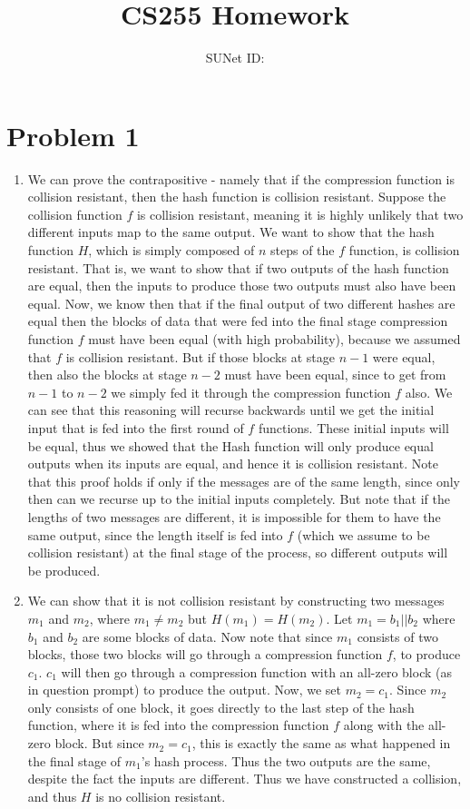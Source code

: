 \documentclass{article}
\title{CS255 Homework \esnumber}
\author{\studentname \qquad SUNet ID: \suid}
\begin{document}
\maketitle

\section*{Problem 1}
\begin{enumerate}
\item %
We can prove the contrapositive - namely that if the compression function is collision resistant, then the hash function is collision resistant. Suppose the collision function $f$ is collision resistant, meaning it is highly unlikely that two different inputs map to the same output. We want to show that the hash function $H$, which is simply composed of $n$ steps of the $f$ function, is collision resistant. That is, we want to show that if two outputs of the hash function are equal, then the inputs to produce those two outputs must also have been equal.
Now, we know then that if the final output of two different hashes are equal then the blocks of data that were fed into the final stage compression function $f$ must have been equal (with high probability), because we assumed that $f$ is collision resistant. But if those blocks at stage $n-1$ were equal, then also the blocks at stage $n-2$ must have been equal, since to get from $n-1$ to $n-2$ we simply fed it through the compression function $f$ also. We can see that this reasoning will recurse backwards until we get the initial input that is fed into the first round of $f$ functions. These initial inputs will be equal, thus we showed that the Hash function will only produce equal outputs when its inputs are equal, and hence it is collision resistant.
Note that this proof holds if only if the messages are of the same length, since only then can we recurse up to the initial inputs completely. But note that if the lengths of two messages are different, it is impossible for them to have the same output, since the length itself is fed into $f$ (which we assume to be collision resistant) at the final stage of the process, so different outputs will be produced.

\item %
We can show that it is not collision resistant by constructing two messages $m_1$ and $m_2$, where $m_1 \neq m_2$ but $H(m_1) = H(m_2)$. Let $m_1 = b_1 || b_2$ where $b_1$ and $b_2$ are some blocks of data. Now note that since $m_1$ consists of two blocks, those two blocks will go through a compression function $f$, to produce $c_1$. $c_1$ will then go through a compression function with an all-zero block (as in question prompt) to produce the output. Now, we set $m_2 = c_1$. Since $m_2$ only consists of one block, it goes directly to the last step of the hash function, where it is fed into the compression function $f$ along with the all-zero block. But since $m_2 = c_1$, this is exactly the same as what happened in the final stage of $m_1$'s hash process. Thus the two outputs are the same, despite the fact the inputs are different. Thus we have constructed a collision, and thus $H$ is no collision resistant. 

\end{enumerate}
\end{document}
